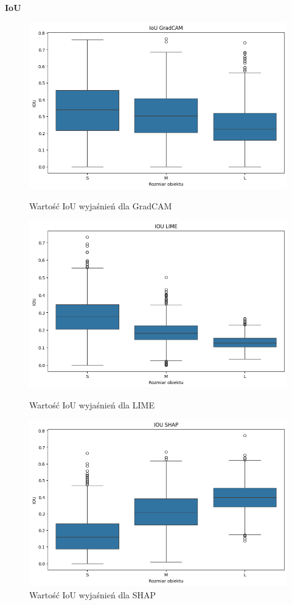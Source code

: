 \textbf{IoU}
\begin{figure}
	\centering
	\begin{minipage}[b]{0.3\textwidth}
		\centering\includegraphics[width=.9\textwidth]{img/size_iou_gradcam}
		\caption{Wartość IoU wyjaśnień dla GradCAM}  \label{rys:size_iou_gradcam}
	\end{minipage}
	\begin{minipage}[b]{0.3\textwidth}
		\centering\includegraphics[width=.9\textwidth]{img/size_iou_lime}
		\caption{Wartość IoU wyjaśnień dla LIME}  \label{rys:size_iou_lime}
	\end{minipage}
	\begin{minipage}[b]{0.3\textwidth}
		\centering\includegraphics[width=.9\textwidth]{img/size_iou_shap}
		\caption{Wartość IoU wyjaśnień dla SHAP}  \label{rys:size_iou_shap}
	\end{minipage}
\end{figure}

